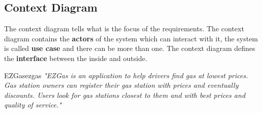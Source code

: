 \documentclass[12pt]{article}
\begin{document}
\subsection{Context Diagram}
The context diagram tells what is the focus of the requirements. The context diagram contains the \textbf{actors} of the system which can interact with it, the system is called \textbf{use case} and there can be more than one. The context diagram defines the \textbf{interface} between the inside and outside.


\begin{example}{EZGas}{ezgas}
  \emph{"EZGas is an application to help drivers find gas at lowest prices. Gas station owners can register their gas station with prices and eventually discounts. Users look for gas stations closest to them and with best prices and quality of service."}
  

\end{example}
\end{document}
